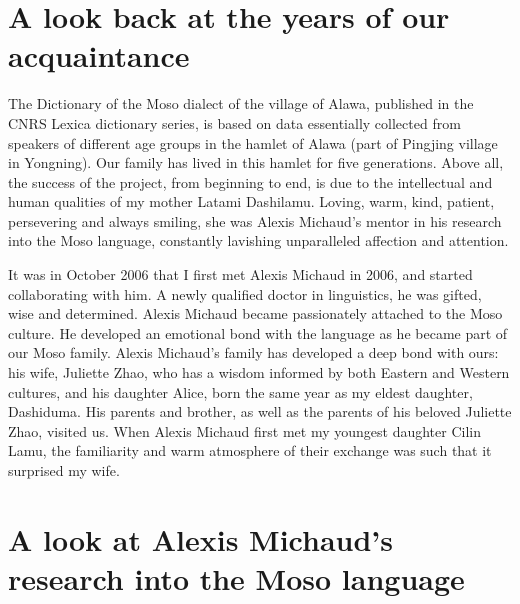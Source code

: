 \section*{A look back at the years of our acquaintance}

The Dictionary of the Moso dialect of the village of Alawa, published in the CNRS Lexica dictionary series, is based on data essentially collected from speakers of different age groups in the hamlet of Alawa (part of Pingjing village in Yongning). Our family has lived in this hamlet for five generations. Above all, the success of the project, from beginning to end, is due to the intellectual and human qualities of my mother Latami Dashilamu. Loving, warm, kind, patient, persevering and always smiling, she was Alexis Michaud's mentor in his research into the Moso language, constantly lavishing unparalleled affection and attention.

It was in October 2006 that I first met Alexis Michaud in 2006, and started collaborating with him. A newly qualified doctor in linguistics, he was gifted, wise and determined. Alexis Michaud became passionately attached to the Moso culture. He developed an emotional bond with the language as he became part of our Moso family. Alexis Michaud's family has developed a deep bond with ours: his wife, Juliette Zhao, who has a wisdom informed by both Eastern and Western cultures, and his daughter Alice, born the same year as my eldest daughter, Dashiduma. His parents and brother, as well as the parents of his beloved Juliette Zhao, visited us. When Alexis Michaud first met my youngest daughter Cilin Lamu, the familiarity and warm atmosphere of their exchange was such that it surprised my wife.

\section*{A look at Alexis Michaud's research into the Moso language}


